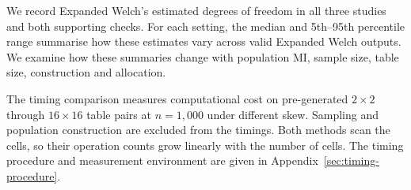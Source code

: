 We record Expanded Welch's estimated degrees of freedom in
all three studies and both supporting checks. For each setting, the median and
5th--95th percentile range summarise how these estimates vary across
valid Expanded Welch outputs. We examine how these summaries change with
population MI, sample size, table size, construction and allocation.

\medskip
{}

The timing comparison measures computational cost on pre-generated
\(2\times2\) through \(16\times16\) table pairs at
\(n=1{,}000\) under different skew. Sampling and population construction
are excluded from the timings. Both methods scan the cells, so their
operation counts grow linearly with the number of cells. The timing
procedure and measurement environment are given in
Appendix~\ref{sec:timing-procedure}.

